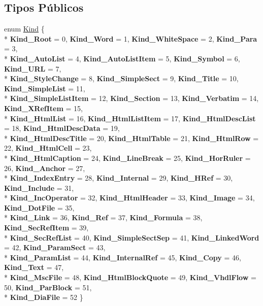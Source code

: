 \subsection*{Tipos Públicos}
\begin{DoxyCompactItemize}
\item 
enum \hyperlink{class_doc_node_aa10c9e8951b8ccf714a59ec321bdac5b}{Kind} \{ \\*
{\bfseries Kind\-\_\-\-Root} = 0, 
{\bfseries Kind\-\_\-\-Word} = 1, 
{\bfseries Kind\-\_\-\-White\-Space} = 2, 
{\bfseries Kind\-\_\-\-Para} = 3, 
\\*
{\bfseries Kind\-\_\-\-Auto\-List} = 4, 
{\bfseries Kind\-\_\-\-Auto\-List\-Item} = 5, 
{\bfseries Kind\-\_\-\-Symbol} = 6, 
{\bfseries Kind\-\_\-\-U\-R\-L} = 7, 
\\*
{\bfseries Kind\-\_\-\-Style\-Change} = 8, 
{\bfseries Kind\-\_\-\-Simple\-Sect} = 9, 
{\bfseries Kind\-\_\-\-Title} = 10, 
{\bfseries Kind\-\_\-\-Simple\-List} = 11, 
\\*
{\bfseries Kind\-\_\-\-Simple\-List\-Item} = 12, 
{\bfseries Kind\-\_\-\-Section} = 13, 
{\bfseries Kind\-\_\-\-Verbatim} = 14, 
{\bfseries Kind\-\_\-\-X\-Ref\-Item} = 15, 
\\*
{\bfseries Kind\-\_\-\-Html\-List} = 16, 
{\bfseries Kind\-\_\-\-Html\-List\-Item} = 17, 
{\bfseries Kind\-\_\-\-Html\-Desc\-List} = 18, 
{\bfseries Kind\-\_\-\-Html\-Desc\-Data} = 19, 
\\*
{\bfseries Kind\-\_\-\-Html\-Desc\-Title} = 20, 
{\bfseries Kind\-\_\-\-Html\-Table} = 21, 
{\bfseries Kind\-\_\-\-Html\-Row} = 22, 
{\bfseries Kind\-\_\-\-Html\-Cell} = 23, 
\\*
{\bfseries Kind\-\_\-\-Html\-Caption} = 24, 
{\bfseries Kind\-\_\-\-Line\-Break} = 25, 
{\bfseries Kind\-\_\-\-Hor\-Ruler} = 26, 
{\bfseries Kind\-\_\-\-Anchor} = 27, 
\\*
{\bfseries Kind\-\_\-\-Index\-Entry} = 28, 
{\bfseries Kind\-\_\-\-Internal} = 29, 
{\bfseries Kind\-\_\-\-H\-Ref} = 30, 
{\bfseries Kind\-\_\-\-Include} = 31, 
\\*
{\bfseries Kind\-\_\-\-Inc\-Operator} = 32, 
{\bfseries Kind\-\_\-\-Html\-Header} = 33, 
{\bfseries Kind\-\_\-\-Image} = 34, 
{\bfseries Kind\-\_\-\-Dot\-File} = 35, 
\\*
{\bfseries Kind\-\_\-\-Link} = 36, 
{\bfseries Kind\-\_\-\-Ref} = 37, 
{\bfseries Kind\-\_\-\-Formula} = 38, 
{\bfseries Kind\-\_\-\-Sec\-Ref\-Item} = 39, 
\\*
{\bfseries Kind\-\_\-\-Sec\-Ref\-List} = 40, 
{\bfseries Kind\-\_\-\-Simple\-Sect\-Sep} = 41, 
{\bfseries Kind\-\_\-\-Linked\-Word} = 42, 
{\bfseries Kind\-\_\-\-Param\-Sect} = 43, 
\\*
{\bfseries Kind\-\_\-\-Param\-List} = 44, 
{\bfseries Kind\-\_\-\-Internal\-Ref} = 45, 
{\bfseries Kind\-\_\-\-Copy} = 46, 
{\bfseries Kind\-\_\-\-Text} = 47, 
\\*
{\bfseries Kind\-\_\-\-Msc\-File} = 48, 
{\bfseries Kind\-\_\-\-Html\-Block\-Quote} = 49, 
{\bfseries Kind\-\_\-\-Vhdl\-Flow} = 50, 
{\bfseries Kind\-\_\-\-Par\-Block} = 51, 
\\*
{\bfseries Kind\-\_\-\-Dia\-File} = 52
 \}
\end{DoxyCompactItemize}
